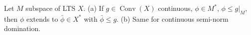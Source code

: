 Let $M$ subspace of LTS $X$. (a) If $g\in\operatorname{Conv}(X)$ continuous, $\phi\in M^*$, $\phi\leqslant g|_M$, then $\phi$ extends to $\bar{\phi}\in X^*$ with $\bar{\phi}\leqslant g$. (b) Same for continuous semi-norm domination.
